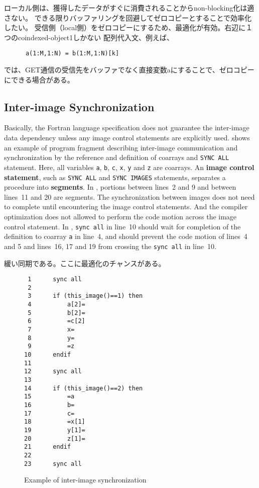 \requirement
ローカル側は、獲得したデータがすぐに消費されることからnon-blocking化は適さない。
できる限りバッファリングを回避してゼロコピーとすることで効率化したい。
受信側（local側）をゼロコピーにするため、最適化が有効。右辺に１つのcoindexed-object1しかない
配列代入文、例えば、
\begin{verbatim}
      a(1:M,1:N) = b(1:M,1:N)[k]
\end{verbatim}
では、GET通信の受信先をバッファでなく直接変数aにすることで、ゼロコピーにできる場合がある。


\subsection{Inter-image Synchronization}
Basically, the Fortran language specification does not guarantee the inter-image 
data dependency unless any image control statements are explicitly used.
 shows an example of program fragment describing inter-image communication
and synchronization by the reference and definition of coarrays and {\tt SYNC ALL} statement.
Here, all variables {\tt a}, {\tt b}, {\tt c}, {\tt x}, {\tt y} and {\tt z} are coarrays.
%
An {\bf image control statement}, such as {\tt SYNC ALL} and {\tt SYNC IMAGES} statements, 
separates a procedure into {\bf segments}. In , portions between lines~2 and 9 and 
between lines~11 and 20 are segments.
The synchronization between images does not need to complete until encountering the 
image control statements. And the compiler optimization does not allowed to perform 
the code motion across the image control statement. In , 
{\tt sync all} in line~10 should wait for completion of the definition to coarray {\tt a} 
in line~4, and should prevent the code motion of lines~4 and 5 and lines~16, 17 and 19 
from crossing the {\tt sync all} in line~10.

緩い同期である。ここに最適化のチャンスがある。

\begin{figure}[hbt]
 \begin{center}
\begin{verbatim}
 1      sync all
 2
 3      if (this_image()==1) then
 4          a[2]=
 5          b[2]=
 6          =c[2]
 7          x=
 8          y=
 9          =z
10      endif
11
12      sync all
13
14      if (this_image()==2) then
15          =a
16          b=
17          c=
18          =x[1]
19          y[1]=
20          z[1]=
21      endif
22
23      sync all

\end{verbatim}
  \caption{Example of inter-image synchronization}
  \label{fig:sync-ex}
 \end{center}
\end{figure}



